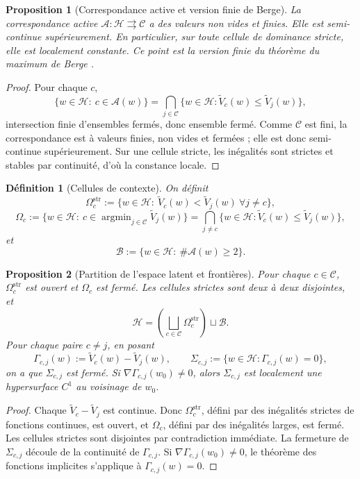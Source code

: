 \documentclass[11pt,a4paper]{article}
\newtheorem{definition}{Définition}[section]
\newtheorem{proposition}{Proposition}[section]
\DeclareMathOperator{\argmin}{argmin}
\newcommand{\Hh}{\mathcal H}
\newcommand{\Ccal}{\mathcal C}
\newcommand{\Acal}{\mathcal A}
\newcommand{\Bcal}{\mathcal B}
\begin{document}
\begin{proposition}[Correspondance active et version finie de Berge]
La correspondance active \(\Acal:\Hh\rightrightarrows\Ccal\) a des valeurs non vides et finies. Elle est semi-continue supérieurement. En particulier, sur toute cellule de dominance stricte, elle est localement constante. Ce point est la version finie du théorème du maximum de Berge \cite{Berge1963}.
\end{proposition}

\begin{proof}
Pour chaque \(c\),
\[
\{w\in\Hh:\ c\in\Acal(w)\}
=
\bigcap_{j\in\Ccal}\{w\in\Hh:\widetilde V_c(w)\le \widetilde V_j(w)\},
\]
intersection finie d'ensembles fermés, donc ensemble fermé. Comme \(\Ccal\) est fini, la correspondance est à valeurs finies, non vides et fermées ; elle est donc semi-continue supérieurement. Sur une cellule stricte, les inégalités sont strictes et stables par continuité, d'où la constance locale.
\end{proof}

\begin{definition}[Cellules de contexte]
On définit
\[
\Omega_c^{\mathrm{str}}:=\{w\in\Hh:\ \widetilde V_c(w)<\widetilde V_j(w)\ \forall j\neq c\},
\]
\[
\Omega_c:=\{w\in\Hh:\ c\in\argmin_{j\in\Ccal}\widetilde V_j(w)\}
=\bigcap_{j\neq c}\{w\in\Hh:\widetilde V_c(w)\le \widetilde V_j(w)\},
\]
et
\[
\Bcal:=\{w\in\Hh:\ \#\Acal(w)\ge 2\}.
\]
\end{definition}

\begin{proposition}[Partition de l'espace latent et frontières]
Pour chaque \(c\in\Ccal\), \(\Omega_c^{\mathrm{str}}\) est ouvert et \(\Omega_c\) est fermé. Les cellules strictes sont deux à deux disjointes, et
\[
\Hh=\left(\bigsqcup_{c\in\Ccal}\Omega_c^{\mathrm{str}}\right)\sqcup \Bcal.
\]
Pour chaque paire \(c\neq j\), en posant
\[
\Gamma_{c,j}(w):=\widetilde V_c(w)-\widetilde V_j(w),
\qquad
\Sigma_{c,j}:=\{w\in\Hh:\Gamma_{c,j}(w)=0\},
\]
on a que \(\Sigma_{c,j}\) est fermé. Si \(\nabla\Gamma_{c,j}(w_0)\neq 0\), alors \(\Sigma_{c,j}\) est localement une hypersurface \(C^1\) au voisinage de \(w_0\).
\end{proposition}

\begin{proof}
Chaque \(\widetilde V_c-\widetilde V_j\) est continue. Donc \(\Omega_c^{\mathrm{str}}\), défini par des inégalités strictes de fonctions continues, est ouvert, et \(\Omega_c\), défini par des inégalités larges, est fermé. Les cellules strictes sont disjointes par contradiction immédiate. La fermeture de \(\Sigma_{c,j}\) découle de la continuité de \(\Gamma_{c,j}\). Si \(\nabla\Gamma_{c,j}(w_0)\neq 0\), le théorème des fonctions implicites s'applique à \(\Gamma_{c,j}(w)=0\).
\end{proof}
\end{document}
